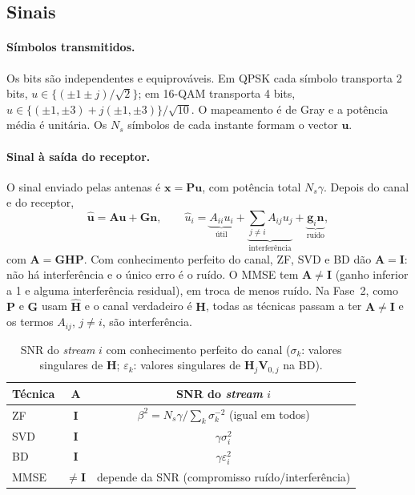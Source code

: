 \subsection{Sinais}
\label{sec:sinais}

\paragraph{Símbolos transmitidos.}
Os bits são independentes e equiprováveis. Em QPSK cada símbolo transporta 2 bits, $u\in\{(\pm1\pm j)/\sqrt2\}$; em 16-QAM transporta 4 bits, $u\in\{(\pm1,\pm3)+j(\pm1,\pm3)\}/\sqrt{10}$. O mapeamento é de Gray e a potência média é unitária. Os $N_s$ símbolos de cada instante formam o vector $\mathbf{u}$.

\paragraph{Sinal à saída do receptor.}
O sinal enviado pelas antenas é $\mathbf{x}=\mathbf{P}\mathbf{u}$, com potência total $N_s\gamma$. Depois do canal e do receptor,
\begin{equation}
  \hat{\mathbf{u}}=\mathbf{A}\mathbf{u}+\mathbf{G}\mathbf{n},\qquad
  \hat{u}_i=\underbrace{A_{ii}u_i}_{\text{útil}}+\underbrace{\sum_{j\neq i}A_{ij}u_j}_{\text{interferência}}+\underbrace{\mathbf{g}_i\mathbf{n}}_{\text{ruído}},
  \label{eq:saida}
\end{equation}
com $\mathbf{A}=\mathbf{G}\mathbf{H}\mathbf{P}$. Com conhecimento perfeito do canal, ZF, SVD e BD dão $\mathbf{A}=\mathbf{I}$: não há interferência e o único erro é o ruído. O MMSE tem $\mathbf{A}\neq\mathbf{I}$ (ganho inferior a 1 e alguma interferência residual), em troca de menos ruído. Na Fase~2, como $\mathbf{P}$ e $\mathbf{G}$ usam $\hat{\mathbf{H}}$ e o canal verdadeiro é $\mathbf{H}$, todas as técnicas passam a ter $\mathbf{A}\neq\mathbf{I}$ e os termos $A_{ij}$, $j\neq i$, são interferência.

\begin{table}[H]
  \centering
  \caption{SNR do \emph{stream} $i$ com conhecimento perfeito do canal ($\sigma_k$: valores singulares de $\mathbf{H}$; $\varepsilon_k$: valores singulares de $\mathbf{H}_j\mathbf{V}_{0,j}$ na BD).}
  \label{tab:sinais}
  \begin{tabular}{@{}lcc@{}}
    \toprule
    Técnica & $\mathbf{A}$ & SNR do \emph{stream} $i$ \\
    \midrule
    ZF  & $\mathbf{I}$ & $\beta^2=N_s\gamma\big/\sum_k\sigma_k^{-2}$ (igual em todos) \\
    SVD & $\mathbf{I}$ & $\gamma\sigma_i^2$ \\
    BD  & $\mathbf{I}$ & $\gamma\varepsilon_i^2$ \\
    MMSE & $\neq\mathbf{I}$ & depende da SNR (compromisso ruído/interferência) \\
    \bottomrule
  \end{tabular}
\end{table}

